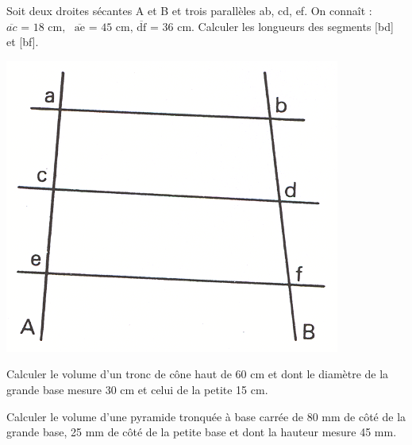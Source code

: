 \begin{exercice}
Soit deux droites sécantes A et B et trois parallèles ab, cd, ef.
On connaît : $\overline{ac}\text{ = 18 cm},\text{ }\overline{\text{ae}}\text{ = 45 cm, }\overline{\text{df}}\text{ = 36 cm}$.
Calculer les longueurs des segments [bd] et [bf].
\begin{center}
\includegraphics[width = 0.4 \textwidth]{triangle/image/pyth23.png}
\end{center}
\end{exercice}

\begin{exercice}
Calculer le volume d’un tronc de cône haut de 60 cm et dont le diamètre de la grande base mesure 30 cm et celui de la petite 15 cm.


\end{exercice}

\begin{exercice}
Calculer le volume d’une pyramide tronquée à base carrée de 80 mm de côté de la grande base, 25 mm de côté de la petite base et dont la hauteur mesure 45 mm.

\end{exercice}